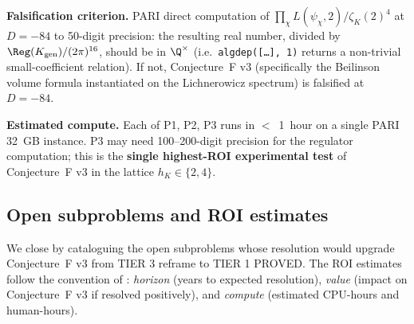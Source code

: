 \textbf{Falsification criterion.}  PARI direct computation of
$\prod_\chi L(\psi_\chi, 2) / \zeta_K(2)^4$ at $D = -84$ to 50-digit
precision: the resulting real number, divided by
$\Reg(K_{\mathrm{gen}}) / (2\pi)^{16}$, should be in $\Q^\times$ (i.e.\
\texttt{algdep([\ldots], 1)} returns a non-trivial small-coefficient
relation).  If not, Conjecture~F v3 (specifically the Beilinson
volume formula instantiated on the Lichnerowicz spectrum) is
falsified at $D = -84$.

\textbf{Estimated compute.}  Each of P1, P2, P3 runs in $<$~1~hour on a
single PARI 32~GB instance.  P3 may need 100--200-digit precision for
the regulator computation; this is the {\bf single highest-ROI
experimental test} of Conjecture~F v3 in the lattice
$h_K \in \{2, 4\}$.

\subsection{Open subproblems and ROI estimates}
\label{sec:conjF-open}

We close by cataloguing the open subproblems whose resolution would
upgrade Conjecture~F v3 from TIER 3 reframe to TIER 1 PROVED.  The
ROI estimates follow the convention of \cite[\S5]{ConjFCanonical2026}:
\emph{horizon} (years to expected resolution), \emph{value}
(impact on Conjecture~F v3 if resolved positively), and
\emph{compute} (estimated CPU-hours and human-hours).

